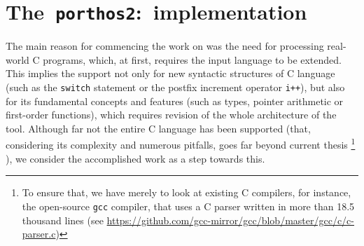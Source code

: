 \chapter{The~\texttt{porthos2}:~implementation}
\label{ch:impl}

The main reason for commencing the work on \porthos[2] was the need for processing real-world C programs, which, at first, requires the input language to be extended.
This implies the support not only for new syntactic structures of C language (such as the \texttt{switch} statement or the postfix increment operator \texttt{i++}), but also for its fundamental concepts and features (such as types, pointer arithmetic or first-order functions), which requires revision of the whole architecture of the tool.
Although far not the entire C language has been supported (that, considering its complexity and numerous pitfalls, goes far beyond current thesis%
\footnote{To ensure that, we have merely to look at existing C compilers, for instance, the open-source \texttt{gcc} compiler, that uses a C parser written in more than 18.5 thousand lines (see \url{https://github.com/gcc-mirror/gcc/blob/master/gcc/c/c-parser.c})}%
), we consider the accomplished work as a step towards this.





